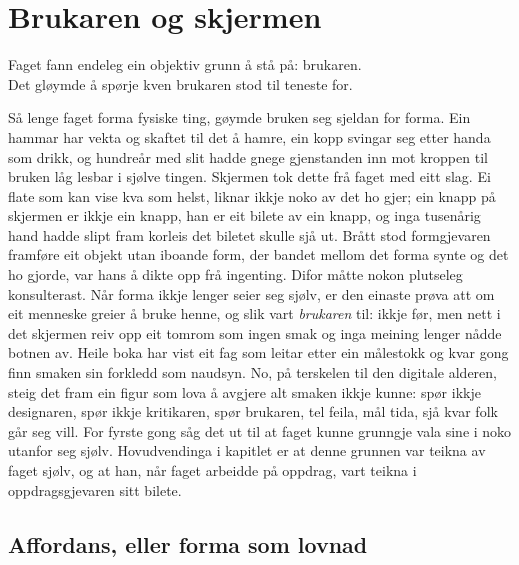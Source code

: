 \chapter{Brukaren og skjermen}

\begin{motto}
Faget fann endeleg ein objektiv grunn å stå på: brukaren.\\ Det gløymde å spørje kven brukaren stod til teneste for.
\end{motto}

Så lenge faget forma fysiske ting, gøymde bruken seg sjeldan for forma. Ein hammar har vekta og skaftet til det å hamre, ein kopp svingar seg etter handa som drikk, og hundreår med slit hadde gnege gjenstanden inn mot kroppen til bruken låg lesbar i sjølve tingen. Skjermen tok dette frå faget med eitt slag. Ei flate som kan vise kva som helst, liknar ikkje noko av det ho gjer; ein knapp på skjermen er ikkje ein knapp, han er eit bilete av ein knapp, og inga tusenårig hand hadde slipt fram korleis det biletet skulle sjå ut. Brått stod formgjevaren framføre eit objekt utan iboande form, der bandet mellom det forma synte og det ho gjorde, var hans å dikte opp frå ingenting. Difor måtte nokon plutseleg konsulterast. Når forma ikkje lenger seier seg sjølv, er den einaste prøva att om eit menneske greier å bruke henne, og slik vart \emph{brukaren} til: ikkje før, men nett i det skjermen reiv opp eit tomrom som ingen smak og inga meining lenger nådde botnen av. Heile boka har vist eit fag som leitar etter ein målestokk og kvar gong finn smaken sin forkledd som naudsyn. No, på terskelen til den digitale alderen, steig det fram ein figur som lova å avgjere alt smaken ikkje kunne: spør ikkje designaren, spør ikkje kritikaren, spør brukaren, tel feila, mål tida, sjå kvar folk går seg vill. For fyrste gong såg det ut til at faget kunne grunngje vala sine i noko utanfor seg sjølv. Hovudvendinga i kapitlet er at denne grunnen var teikna av faget sjølv, og at han, når faget arbeidde på oppdrag, vart teikna i oppdragsgjevaren sitt bilete.


\section{Affordans, eller forma som lovnad}

